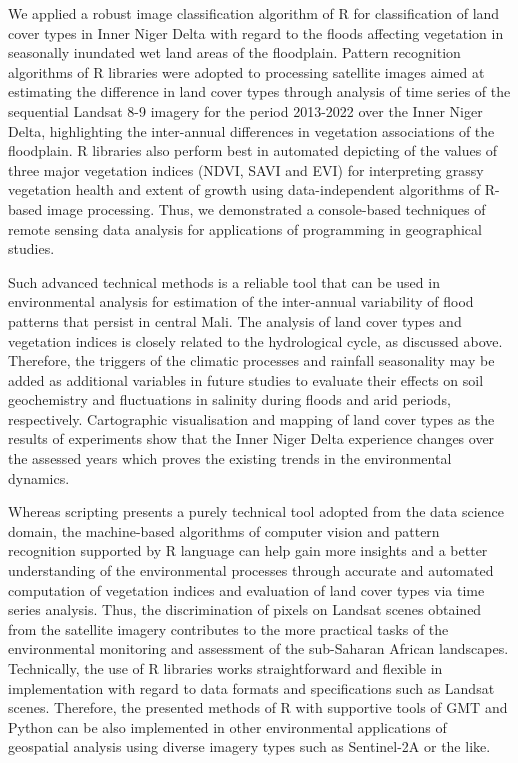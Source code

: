 \documentclass[12pt,a4paper,oneside]{article}
\def \newpar{\vspace{6pt}}
\begin{document}
\newpar We applied a robust image classification algorithm of R for classification of land cover types in Inner Niger Delta with regard to the floods affecting vegetation in seasonally inundated wet land areas of the floodplain. Pattern recognition algorithms of R libraries were adopted to processing satellite images aimed at estimating the difference in land cover types through analysis of time series of the sequential Landsat 8-9 imagery for the period 2013-2022 over the Inner Niger Delta, highlighting the inter-annual differences in vegetation associations of the floodplain. R libraries also perform best in automated depicting of the values of three major vegetation indices (NDVI, SAVI and EVI) for interpreting grassy vegetation health and extent of growth using data-independent algorithms of R-based image processing. Thus, we demonstrated a console-based techniques of remote sensing data analysis for applications of programming in geographical studies. 

\newpar Such advanced technical methods is a reliable tool that can be used in environmental analysis for estimation of the inter-annual variability of flood patterns that persist in central Mali. The analysis of land cover types and vegetation indices is closely related to the hydrological cycle, as discussed above. Therefore, the triggers of the climatic processes and rainfall seasonality may be added as additional variables in future studies to evaluate their effects on soil geochemistry and fluctuations in salinity during floods and arid periods, respectively. Cartographic visualisation and mapping of land cover types as the results of experiments show that the Inner Niger Delta experience changes over the assessed years which proves the existing trends in the environmental dynamics.  

\newpar Whereas scripting presents a purely technical tool adopted from the data science domain, the machine-based algorithms of computer vision and pattern recognition supported by R language can help gain more insights and a better understanding of the environmental processes through accurate and automated computation of vegetation indices and evaluation of land cover types via time series analysis. Thus, the discrimination of pixels on Landsat scenes obtained from the satellite imagery contributes to the more practical tasks of the environmental monitoring and assessment of the sub-Saharan African landscapes. Technically, the use of R libraries works straightforward and flexible in implementation with regard to data formats and specifications such as Landsat scenes. Therefore, the presented methods of R with supportive tools of GMT and Python can be also implemented in other environmental applications of geospatial analysis using diverse imagery types such as Sentinel-2A or the like. 
\end{document}
